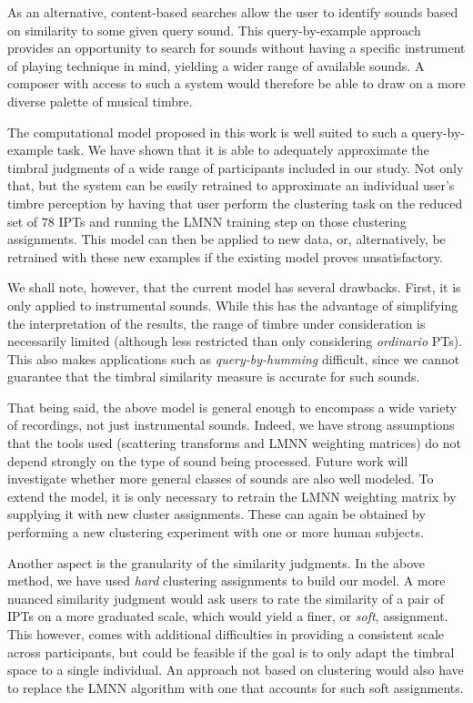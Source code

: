 \documentclass{bmcart}
\begin{document}
As an alternative, content-based searches allow the user to identify sounds based on similarity to some given query sound.
This query-by-example approach provides an opportunity to search for sounds without having a specific instrument of playing technique in mind, yielding a wider range of available sounds.
A composer with access to such a system would therefore be able to draw on a more diverse palette of musical timbre.

The computational model proposed in this work is well suited to such a query-by-example task.
We have shown that it is able to adequately approximate the timbral judgments of a wide range of participants included in our study.
Not only that, but the system can be easily retrained to approximate an individual user's timbre perception by having that user perform the clustering task on the reduced set of $78$ IPTs and running the LMNN training step on those clustering assignments.
This model can then be applied to new data, or, alternatively, be retrained with these new examples if the existing model proves unsatisfactory.

We shall note, however, that the current model has several drawbacks.
First, it is only applied to instrumental sounds.
While this has the advantage of simplifying the interpretation of the results, the range of timbre under consideration is necessarily limited (although less restricted than only considering \emph{ordinario} PTs).
This also makes applications such as \emph{query-by-humming} difficult, since we cannot guarantee that the timbral similarity measure is accurate for such sounds.

That being said, the above model is general enough to encompass a wide variety of recordings, not just instrumental sounds.
Indeed, we have strong assumptions that the tools used (scattering transforms and LMNN weighting matrices) do not depend strongly on the type of sound being processed. Future work will investigate whether more general classes of sounds are also well modeled.
To extend the model, it is only necessary to retrain the LMNN weighting matrix by supplying it with new cluster assignments.
These can again be obtained by performing a new clustering experiment with one or more human subjects.

Another aspect is the granularity of the similarity judgments.
In the above method, we have used \emph{hard} clustering assignments to build our model.
A more nuanced similarity judgment would ask users to rate the similarity of a pair of IPTs on a more graduated scale, which would yield a finer, or \emph{soft}, assignment.
This however, comes with additional difficulties in providing a consistent scale across participants, but could be feasible if the goal is to only adapt the timbral space to a single individual.
An approach not based on clustering would also have to replace the LMNN algorithm with one that accounts for such soft assignments.
\end{document}
